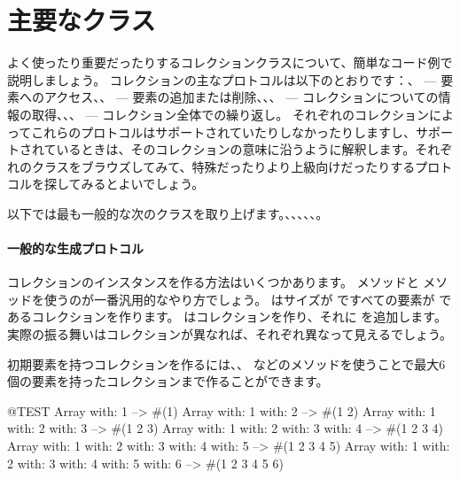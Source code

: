 \documentclass[a4paper,10pt,twoside]{book}
\begin{document}
\section{主要なクラス}
よく使ったり重要だったりするコレクションクラスについて、簡単なコード例で説明しましょう。
コレクションの主なプロトコルは以下のとおりです：、 --- 要素へのアクセス、、 --- 要素の追加または削除、、、 --- コレクションについての情報の取得、、、 --- コレクション全体での繰り返し。
それぞれのコレクションによってこれらのプロトコルはサポートされていたりしなかったりしますし、サポートされているときは、そのコレクションの意味に沿うように解釈します。それぞれのクラスをブラウズしてみて、特殊だったりより上級向けだったりするプロトコルを探してみるとよいでしょう。

以下では最も一般的な次のクラスを取り上げます。、、、、、。

\paragraph{一般的な生成プロトコル}
コレクションのインスタンスを作る方法はいくつかあります。 メソッドと  メソッドを使うのが一番汎用的なやり方でしょう。 はサイズが  ですべての要素が  であるコレクションを作ります。  はコレクションを作り、それに  を追加します。実際の振る舞いはコレクションが異なれば、それぞれ異なって見えるでしょう。

初期要素を持つコレクションを作るには、、 などのメソッドを使うことで最大6個の要素を持ったコレクションまで作ることができます。

\begin{code}{@TEST}
Array with: 1 --> #(1)
Array with: 1 with: 2 --> #(1 2)
Array with: 1 with: 2 with: 3 --> #(1 2 3)
Array with: 1 with: 2 with: 3 with: 4 --> #(1 2 3 4)
Array with: 1 with: 2 with: 3 with: 4 with: 5 --> #(1 2 3 4 5)
Array with: 1 with: 2 with: 3 with: 4 with: 5 with: 6 --> #(1 2 3 4 5 6)
\end{code}
\end{document}
